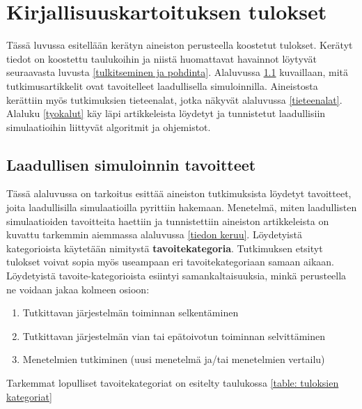\documentclass[utf8]{gradu3}
\begin{document}
\chapter{Kirjallisuuskartoituksen tulokset}
Tässä luvussa esitellään kerätyn aineiston perusteella koostetut tulokset.
Kerätyt tiedot on koostettu taulukoihin ja niistä huomattavat havainnot löytyvät
seuraavasta luvusta \ref{tulkitseminen ja pohdinta}.
Alaluvussa \ref{simulaatiotulokset} kuvaillaan,
mitä tutkimusartikkelit ovat tavoitelleet laadullisella simuloinnilla.
Aineistosta kerättiin myös tutkimuksien tieteenalat, jotka näkyvät alaluvussa
\ref{tieteenalat}.
Alaluku \ref{tyokalut} käy läpi artikkeleista löydetyt 
ja tunnistetut laadullisiin simulaatioihin liittyvät algoritmit ja ohjemistot. 

\section{Laadullisen simuloinnin tavoitteet} \label{simulaatiotulokset}
Tässä alaluvussa on tarkoitus esittää aineiston tutkimuksista 
löydetyt tavoitteet, joita laadullisilla simulaatioilla pyrittiin hakemaan.
Menetelmä, miten laadullisten simulaatioiden tavoitteita haettiin 
ja tunnistettiin aineiston artikkeleista on kuvattu tarkemmin 
aiemmassa alaluvussa \ref{tiedon keruu}.
Löydetyistä kategorioista käytetään nimitystä \textbf{tavoitekategoria}.
Tutkimuksen etsityt tulokset voivat sopia myös useampaan eri tavoitekategoriaan
samaan aikaan. Löydetyistä tavoite-kategorioista esiintyi samankaltaisuuksia, 
minkä perusteella ne voidaan jakaa kolmeen osioon:

\begin{enumerate}
    \item Tutkittavan järjestelmän toiminnan selkentäminen
    \item Tutkittavan järjestelmän vian tai epätoivotun toiminnan selvittäminen
    \item Menetelmien tutkiminen (uusi menetelmä ja/tai menetelmien vertailu)
\end{enumerate}

Tarkemmat lopulliset tavoitekategoriat on esitelty taulukossa \ref{table: tuloksien kategoriat}
\end{document}
